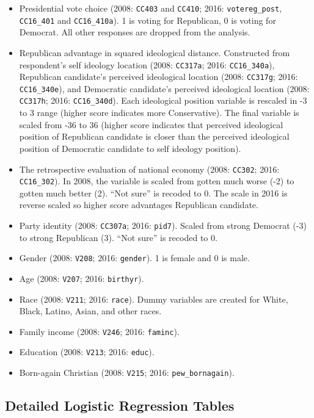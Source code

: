 \begin{itemize}
    \item Presidential vote choice (2008: \texttt{CC403} and \texttt{CC410}; 2016: \texttt{votereg\_post}, \texttt{CC16\_401} and \texttt{CC16\_410a}). 1 is voting for Republican, 0 is voting for Democrat. All other responses are dropped from the analysis.
    \item Republican advantage in squared ideological distance. Constructed from respondent's self ideology location (2008: \texttt{CC317a}; 2016: \texttt{CC16\_340a}), Republican candidate's perceived ideological location (2008: \texttt{CC317g}; 2016: \texttt{CC16\_340e}), and Democratic candidate's perceived ideological location (2008: \texttt{CC317h}; 2016: \texttt{CC16\_340d}). Each ideological position variable is rescaled in -3 to 3 range (higher score indicates more Conservative). The final variable is scaled from -36 to 36 (higher score indicates that perceived ideological position of Republican candidate is closer than the perceived ideological position of Democratic candidate to self ideology position).
    \item The retrospective evaluation of national economy (2008: \texttt{CC302}; 2016: \texttt{CC16\_302}). In 2008, the variable is scaled from gotten much worse (-2) to gotten much better (2). ``Not sure'' is recoded to 0. The scale in 2016 is reverse scaled so higher score advantages Republican candidate.   
    \item Party identity (2008: \texttt{CC307a}; 2016: \texttt{pid7}). Scaled from strong Democrat (-3) to strong Republican (3). ``Not sure'' is recoded to 0.
    \item Gender (2008: \texttt{V208}; 2016: \texttt{gender}). 1 is female and 0 is male.
    \item Age (2008: \texttt{V207}; 2016: \texttt{birthyr}).
    \item Race (2008: \texttt{V211}; 2016: \texttt{race}). Dummy variables are created for White, Black, Latino, Asian, and other races.
    \item Family income (2008: \texttt{V246}; 2016: \texttt{faminc}).
    \item Education (2008: \texttt{V213}; 2016: \texttt{educ}).
    \item Born-again Christian (2008: \texttt{V215}; 2016: \texttt{pew\_bornagain}).
\end{itemize}

\clearpage
\subsection{Detailed Logistic Regression Tables} 

